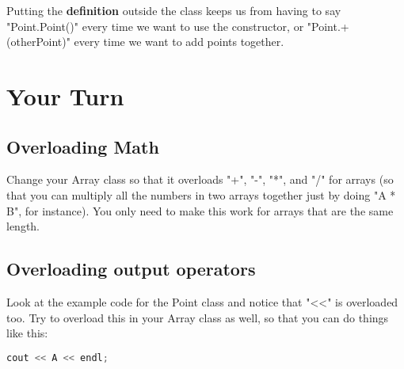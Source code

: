 \documentclass[a4paper,12pt]{article} %
\begin{document}
\noindent
Putting the \textbf{definition} outside the class keeps us from having to say "Point.Point()" every time we want to use the constructor, or "Point.+(otherPoint)" every time we want to add points together. 

\section{Your Turn}

\subsection{Overloading Math}

Change your Array class so that it overloads "+", "-", "*", and "/" for arrays (so that you can multiply all the numbers in two arrays together just by doing "A * B", for instance). You only need to make this work for arrays that are the same length.

\subsection{Overloading output operators}

Look at the example code for the Point class and notice that "\textless\textless" is overloaded too. Try to overload this in your Array class as well, so that you can do things like this:

\vspace{5mm}
\begin{lstlisting}[language=C++]
cout << A << endl;
\end{lstlisting}
\end{document}
